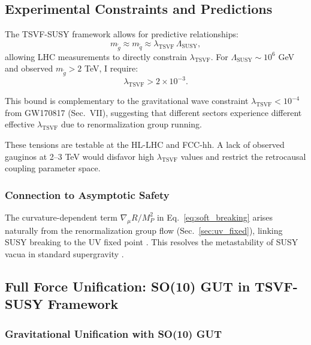 \documentclass[twocolumn,superscriptaddress,floatfix]{revtex4-2}
\begin{document}
\subsection{Experimental Constraints and Predictions}

The TSVF-SUSY framework allows for predictive relationships:
\begin{equation}
m_{\tilde{g}} \approx m_{\tilde{q}} \approx \lambda_{\text{TSVF}} \, \Lambda_{\text{SUSY}},
\end{equation}
allowing LHC measurements to directly constrain $\lambda_{\text{TSVF}}$. For $\Lambda_{\text{SUSY}} \sim 10^6$ GeV and observed $m_{\tilde{g}} > 2$ TeV, I require:
\begin{equation}
\lambda_{\text{TSVF}} > 2 \times 10^{-3}.
\end{equation}

This bound is complementary to the gravitational wave constraint $\lambda_{\text{TSVF}} < 10^{-4}$ from GW170817 (Sec.~VII), suggesting that different sectors experience different effective $\lambda_{\text{TSVF}}$ due to renormalization group running.

These tensions are testable at the HL-LHC and FCC-hh. A lack of observed gauginos at 2–3 TeV would disfavor high $\lambda_{\text{TSVF}}$ values and restrict the retrocausal coupling parameter space.

\subsubsection{Connection to Asymptotic Safety}  
The curvature-dependent term \(\nabla_\mu R/M_P^2\) in Eq.~\eqref{eq:soft_breaking} arises naturally from the renormalization group flow (Sec.~\ref{sec:uv_fixed}), linking SUSY breaking to the UV fixed point \cite{Reuter2012}. This resolves the metastability of SUSY vacua in standard supergravity \cite{Dine2004}.  

\subsection{Full Force Unification: SO(10) GUT in TSVF-SUSY Framework}
\label{subsec:full_unification}

\subsubsection{Gravitational Unification with SO(10) GUT}
\label{subsec:grav_unification}
\end{document}
